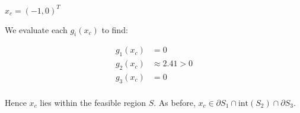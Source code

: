 $ x_c = \left(-1, 0\right)^T$

\begin{solution}
  We evaluate each $g_i(x_c)$ to find:

  \begin{align*}
    g_1(x_c) &= 0 \\
    g_2(x_c) &\approx 2.41 > 0 \\
    g_3(x_c) &= 0 \\
  \end{align*}

  Hence $x_c$ lies within the feasible region $S$. As before, $x_c \in \partial S_1 \cap \text{int}(S_2) \cap \partial S_3 $.
  \ \\
\end{solution}